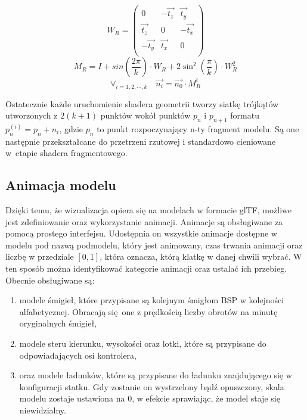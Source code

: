 \begin{equation*}
	W_R = 
	\begin{pmatrix}
		0 & -\vec{t_z} & \vec{t_y} \\
		\vec{t_z} & 0 & -\vec{t_x} \\
		-\vec{t_y} & \vec{t_x} & 0 \\
	\end{pmatrix}
\end{equation*}
\begin{equation*}
	M_R = I + sin \left(\frac{2\pi}{k} \right) \cdot W_R + 2\sin^2 \left(\frac{\pi}{k} \right) \cdot W_R^2
\end{equation*}
\begin{equation*}
	\forall_{i=1,2,\cdots, k} \hspace{1em} \vec{n_i} = \vec{n_0} \cdot M_R^i
\end{equation*}

Ostatecznie każde uruchomienie shadera geometrii tworzy siatkę trójkątów utworzonych z $2(k+1)$ punktów wokół punktów $p_n$ i $p_{n+1}$ formatu $p_n^{(i)} = p_n + n_i$, gdzie $p_n$ to punkt rozpoczynający n-ty fragment modelu. Są one następnie przekształcane do przetrzeni rzutowej i standardowo cieniowane w~etapie shadera fragmentowego.

\subsection{Animacja modelu}

Dzięki temu, że wizualizacja opiera się na modelach w formacie glTF, możliwe jest zdefiniowanie oraz wykorzystanie animacji. Animacje są obsługiwane za pomocą prostego interfejsu. Udostępnia on wszystkie animacje dostępne w modelu pod nazwą podmodelu, który jest animowany, czas trwania animacji oraz liczbę w przedziale $[0,1]$, która oznacza, którą klatkę w danej chwili wybrać. W ten sposób można identyfikować kategorie animacji oraz ustalać ich przebieg. Obecnie obsługiwane są:
\begin{enumerate}
	\item modele śmigieł, które przypisane są kolejnym śmigłom BSP w kolejności alfabetycznej. Obracają się one z prędkością liczby obrotów na minutę oryginalnych śmigieł,
	\item modele steru kierunku, wysokości oraz lotki, które są przypisane do odpowiadających osi kontrolera,
	\item oraz modele ładunków, które są przypisane do ładunku znajdującego się w konfiguracji statku. Gdy zostanie on wystrzelony bądź opuszczony, skala modelu zostaje ustawiona na $0$, w efekcie sprawiając, że model staje się niewidzialny.
\end{enumerate}

